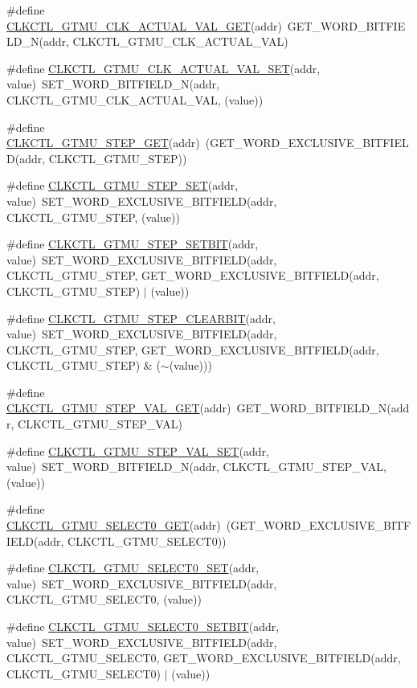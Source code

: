 \begin{DoxyCompactItemize}
\item 
\#define \hyperlink{a00544_a32445187745a7e7f119ed85a2c0eb531}{CLKCTL\_\-GTMU\_\-CLK\_\-ACTUAL\_\-VAL\_\-GET}(addr)~GET\_\-WORD\_\-BITFIELD\_\-N(addr, CLKCTL\_\-GTMU\_\-CLK\_\-ACTUAL\_\-VAL)
\item 
\#define \hyperlink{a00544_ac8adf6dbcd1820f7119b5dcba75a18ec}{CLKCTL\_\-GTMU\_\-CLK\_\-ACTUAL\_\-VAL\_\-SET}(addr, value)~SET\_\-WORD\_\-BITFIELD\_\-N(addr, CLKCTL\_\-GTMU\_\-CLK\_\-ACTUAL\_\-VAL, (value))
\item 
\#define \hyperlink{a00544_a7625613f402e43f180e66cb05be424db}{CLKCTL\_\-GTMU\_\-STEP\_\-GET}(addr)~(GET\_\-WORD\_\-EXCLUSIVE\_\-BITFIELD(addr, CLKCTL\_\-GTMU\_\-STEP))
\item 
\#define \hyperlink{a00544_a8721e0803e295324f179116ccede69f4}{CLKCTL\_\-GTMU\_\-STEP\_\-SET}(addr, value)~SET\_\-WORD\_\-EXCLUSIVE\_\-BITFIELD(addr, CLKCTL\_\-GTMU\_\-STEP, (value))
\item 
\#define \hyperlink{a00544_ad3bf67f0054b254482ec17bd1bf0ebc1}{CLKCTL\_\-GTMU\_\-STEP\_\-SETBIT}(addr, value)~SET\_\-WORD\_\-EXCLUSIVE\_\-BITFIELD(addr, CLKCTL\_\-GTMU\_\-STEP, GET\_\-WORD\_\-EXCLUSIVE\_\-BITFIELD(addr, CLKCTL\_\-GTMU\_\-STEP) $|$ (value))
\item 
\#define \hyperlink{a00544_abcc7c9eba5610c666caea9135c392d9e}{CLKCTL\_\-GTMU\_\-STEP\_\-CLEARBIT}(addr, value)~SET\_\-WORD\_\-EXCLUSIVE\_\-BITFIELD(addr, CLKCTL\_\-GTMU\_\-STEP, GET\_\-WORD\_\-EXCLUSIVE\_\-BITFIELD(addr, CLKCTL\_\-GTMU\_\-STEP) \& ($\sim$(value)))
\item 
\#define \hyperlink{a00544_aaa1d1bdf1d2e83d4ce77dcf8e92317a3}{CLKCTL\_\-GTMU\_\-STEP\_\-VAL\_\-GET}(addr)~GET\_\-WORD\_\-BITFIELD\_\-N(addr, CLKCTL\_\-GTMU\_\-STEP\_\-VAL)
\item 
\#define \hyperlink{a00544_a50eb2f6fd6ade6aaf92263c5b49e5100}{CLKCTL\_\-GTMU\_\-STEP\_\-VAL\_\-SET}(addr, value)~SET\_\-WORD\_\-BITFIELD\_\-N(addr, CLKCTL\_\-GTMU\_\-STEP\_\-VAL, (value))
\item 
\#define \hyperlink{a00544_a4aaa68b8627b3701bbc4e98ec82f30d2}{CLKCTL\_\-GTMU\_\-SELECT0\_\-GET}(addr)~(GET\_\-WORD\_\-EXCLUSIVE\_\-BITFIELD(addr, CLKCTL\_\-GTMU\_\-SELECT0))
\item 
\#define \hyperlink{a00544_a79ef88cf91a57aa851eb03fe91aa9c6a}{CLKCTL\_\-GTMU\_\-SELECT0\_\-SET}(addr, value)~SET\_\-WORD\_\-EXCLUSIVE\_\-BITFIELD(addr, CLKCTL\_\-GTMU\_\-SELECT0, (value))
\item 
\#define \hyperlink{a00544_a7d2e206fb0011d8a6b775911205baa4f}{CLKCTL\_\-GTMU\_\-SELECT0\_\-SETBIT}(addr, value)~SET\_\-WORD\_\-EXCLUSIVE\_\-BITFIELD(addr, CLKCTL\_\-GTMU\_\-SELECT0, GET\_\-WORD\_\-EXCLUSIVE\_\-BITFIELD(addr, CLKCTL\_\-GTMU\_\-SELECT0) $|$ (value))

\end{DoxyCompactItemize}
